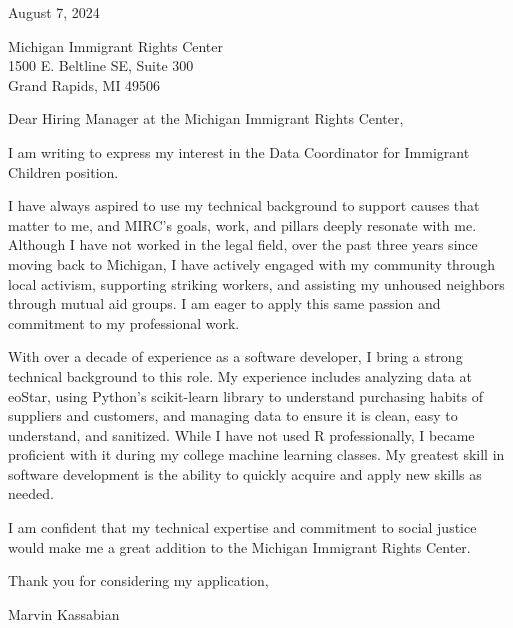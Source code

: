 \documentclass{../styles/coverletter}
\begin{document}
\populatedtitle

August 7, 2024

Michigan Immigrant Rights Center\\
1500 E. Beltline SE, Suite 300\\
Grand Rapids, MI 49506

Dear Hiring Manager at the Michigan Immigrant Rights Center,\newline

I am writing to express my interest in the Data Coordinator for Immigrant Children position.\newline

I have always aspired to use my technical background to support causes that matter to me, and MIRC's goals, work, and pillars deeply resonate with me. Although I have not worked in the legal field, over the past three years since moving back to Michigan, I have actively engaged with my community through local activism, supporting striking workers, and assisting my unhoused neighbors through mutual aid groups. I am eager to apply this same passion and commitment to my professional work.\newline

With over a decade of experience as a software developer, I bring a strong technical background to this role. My experience includes analyzing data at eoStar, using Python’s scikit-learn library to understand purchasing habits of suppliers and customers, and managing data to ensure it is clean, easy to understand, and sanitized. While I have not used R professionally, I became proficient with it during my college machine learning classes. My greatest skill in software development is the ability to quickly acquire and apply new skills as needed.\newline

I am confident that my technical expertise and commitment to social justice would make me a great addition to the Michigan Immigrant Rights Center.\newline

Thank you for considering my application,

Marvin Kassabian
\end{document}
